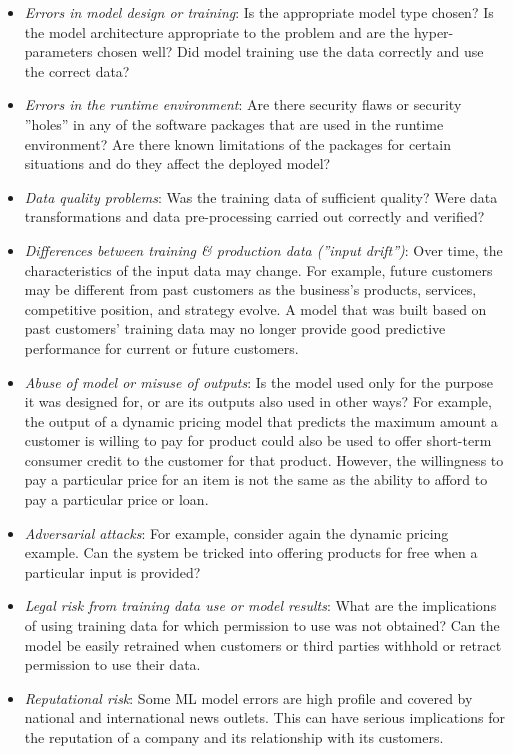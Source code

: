 \begin{itemize}
   \item \emph{Errors in model design or training}: Is the appropriate model type chosen? Is the model architecture appropriate to the problem and are the hyper-parameters chosen well? Did model training use the data correctly and use the correct data?
   \item \emph{Errors in the runtime environment}: Are there security flaws or security ''holes'' in any of the software packages that are used in the runtime environment? Are there known limitations of the packages for certain situations and do they affect the deployed model?
   \item \emph{Data quality problems}: Was the training data of sufficient quality? Were data transformations and data pre-processing carried out correctly and verified?
   \item \emph{Differences between training \& production data (''input drift'')}: Over time, the characteristics of the input data may change. For example, future customers may be different from past customers as the business's products, services, competitive position, and strategy evolve. A model that was built based on past customers' training data may no longer provide good predictive performance for current or future customers. 
   \item \emph{Abuse of model or misuse of outputs}: Is the model used only for the purpose it was designed for, or are its outputs also used in other ways? For example, the output of a dynamic pricing model that predicts the maximum amount a customer is willing to pay for product could also be used to offer short-term consumer credit to the customer for that product. However, the willingness to pay a particular price for an item is not the same as the ability to afford to pay a particular price or loan.
   \item \emph{Adversarial attacks}: For example, consider again the dynamic pricing example. Can the system be tricked into offering products for free when a particular input is provided?
   \item \emph{Legal risk from training data use or model results}: What are the implications of using training data for which permission to use was not obtained? Can the model be easily retrained when customers or third parties withhold or retract permission to use their data.
   \item \emph{Reputational risk}: Some ML model errors are high profile and covered by national and international news outlets. This can have serious implications for the reputation of a company and its relationship with its customers. 
\end{itemize}

